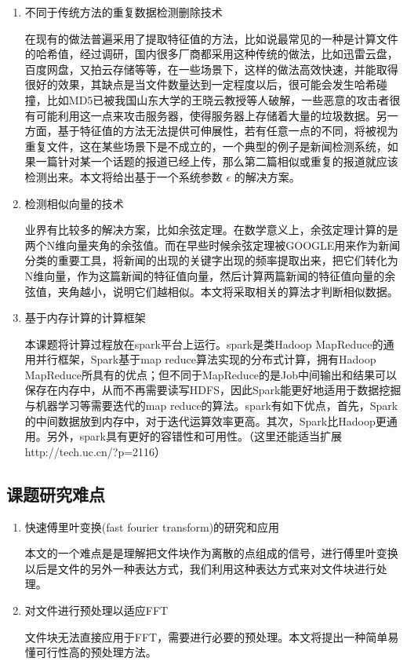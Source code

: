 \begin{enumerate}
\item 不同于传统方法的重复数据检测删除技术

在现有的做法普遍采用了提取特征值的方法，比如说最常见的一种是计算文件的哈希值，经过调研，国内很多厂商都采用这种传统的做法，比如迅雷云盘，百度网盘，又拍云存储等等，在一些场景下，这样的做法高效快速，并能取得很好的效果，其缺点是当文件数量达到一定程度以后，很可能会发生哈希碰撞，比如MD5已被我国山东大学的王晓云教授等人破解，一些恶意的攻击者很有可能利用这一点来攻击服务器，使得服务器上存储着大量的垃圾数据。另一方面，基于特征值的方法无法提供可伸展性，若有任意一点的不同，将被视为重复文件，这在某些场景下是不成立的，一个典型的例子是新闻检测系统，如果一篇针对某一个话题的报道已经上传，那么第二篇相似或重复的报道就应该检测出来。本文将给出基于一个系统参数 $\epsilon$ 的解决方案。

\item 检测相似向量的技术

业界有比较多的解决方案，比如余弦定理。在数学意义上，余弦定理计算的是两个N维向量夹角的余弦值。而在早些时候余弦定理被GOOGLE用来作为新闻分类的重要工具，将新闻的出现的关键字出现的频率提取出来，把它们转化为N维向量，作为这篇新闻的特征值向量，然后计算两篇新闻的特征值向量的余弦值，夹角越小，说明它们越相似。本文将采取相关的算法才判断相似数据。

\item 基于内存计算的计算框架

本课题将计算过程放在spark平台上运行。spark是类Hadoop MapReduce的通用并行框架，Spark基于map reduce算法实现的分布式计算，拥有Hadoop MapReduce所具有的优点；但不同于MapReduce的是Job中间输出和结果可以保存在内存中，从而不再需要读写HDFS，因此Spark能更好地适用于数据挖掘与机器学习等需要迭代的map reduce的算法。spark有如下优点，首先，Spark的中间数据放到内存中，对于迭代运算效率更高。其次，Spark比Hadoop更通用。另外，spark具有更好的容错性和可用性。（这里还能适当扩展http://tech.uc.cn/?p=2116）

\end{enumerate}

\subsection{课题研究难点}
\label{sec:point2}

\begin{enumerate}
\item 快速傅里叶变换(fast fourier transform)的研究和应用

本文的一个难点是是理解把文件块作为离散的点组成的信号，进行傅里叶变换以后是文件的另外一种表达方式，我们利用这种表达方式来对文件块进行处理。

\item 对文件进行预处理以适应FFT

文件块无法直接应用于FFT，需要进行必要的预处理。本文将提出一种简单易懂可行性高的预处理方法。
\end{enumerate}

